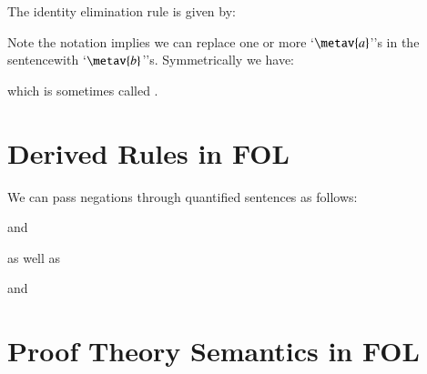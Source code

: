 \documentclass[12pt, a4paper, twoside, openright, titlepage]{book}
\begin{document}
\begin{defn}{}{}
    The identity elimination rule is given by:\begin{fitchproof}
         
    \end{fitchproof}
    Note the notation implies we can replace one or more `$\metav{a}$''s in the sentencewith `$\metav{b}$''s. Symmetrically we have:\begin{fitchproof}
         
    \end{fitchproof}
    which is sometimes called .
\end{defn}


\section{\textsection Derived Rules in FOL}

\begin{defn}{}{}
    We can pass negations through quantified sentences as follows:
    \begin{fitchproof}
         
    \end{fitchproof}
    and \begin{fitchproof}
         
    \end{fitchproof}
    as well as \begin{fitchproof}
         
    \end{fitchproof}
    and \begin{fitchproof}
         
    \end{fitchproof}
\end{defn}



\section{\textsection Proof Theory Semantics in FOL}
\end{document}

